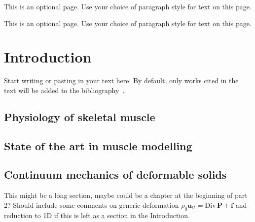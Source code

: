 \documentclass{sfuthesis}
\numberwithin{equation}{section}
\numberwithin{figure}{chapter}
\numberwithin{table}{chapter}
\theoremstyle{definition}
\def\*#1{{\mathbf{#1}}} %
\newcommand{\Divt}[1]{{\bm{\mathrm{Div}} \, #1}}
\begin{document}
\begin{dedication}
This is an optional page. Use your choice of paragraph style for text on this page.
\end{dedication}


\begin{acknowledgements}
This is an optional page. Use your choice of paragraph style for text on this page.
\end{acknowledgements}

%
\hypersetup{linkbordercolor=black,hidelinks}
\tableofcontents%
\clearpage

%
\listoftables%
\clearpage

%
\listoffigures%
\clearpage





%
%

\mainmatter%

\chapter{Introduction}

Start writing or pasting in your text here. By default, only works cited in the text will be added to the bibliography~\cite{HolzapfelBook}.

\section{Physiology of skeletal muscle}

\section{State of the art in muscle modelling}

\section{Continuum mechanics of deformable solids}

This might be a long section, maybe could be a chapter at the beginning of part 2? Should include some comments on generic deformation $\rho_0 \*u_{tt} = \Divt{\*P} + \*f$ and reduction to 1D if this is left as a section in the Introduction.
\end{document}
